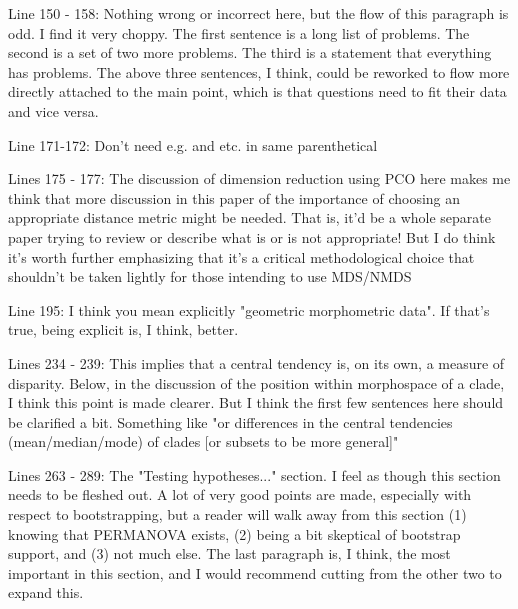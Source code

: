 \documentclass[12pt,letterpaper]{article}
\begin{document}

Line 150 - 158: Nothing wrong or incorrect here, but the flow of this paragraph is odd. I find it very choppy. The first sentence is a long list of problems. The second is a set of two more problems. The third is a statement that everything has problems. The above three sentences, I think, could be reworked to flow more directly attached to the main point, which is that questions need to fit their data and vice versa.


Line 171-172: Don't need e.g. and etc. in same parenthetical


Lines 175 - 177: The discussion of dimension reduction using PCO here makes me think that more discussion in this paper of the importance of choosing an appropriate distance metric might be needed. That is, it'd be a whole separate paper trying to review or describe what is or is not appropriate! But I do think it's worth further emphasizing that it's a critical methodological choice that shouldn't be taken lightly for those intending to use MDS/NMDS


Line 195: I think you mean explicitly "geometric morphometric data". If that's true, being explicit is, I think, better.


Lines 234 - 239: This implies that a central tendency is, on its own, a measure of disparity. Below, in the discussion of the position within morphospace of a clade, I think this point is made clearer. But I think the first few sentences here should be clarified a bit. Something like "or differences in the central tendencies (mean/median/mode) of clades [or subsets to be more general]"


Lines 263 - 289: The "Testing hypotheses..." section. I feel as though this section needs to be fleshed out. A lot of very good points are made, especially with respect to bootstrapping, but a reader will walk away from this section (1) knowing that PERMANOVA exists, (2) being a bit skeptical of bootstrap support, and (3) not much else. The last paragraph is, I think, the most important in this section, and I would recommend cutting from the other two to expand this.
\end{document}
